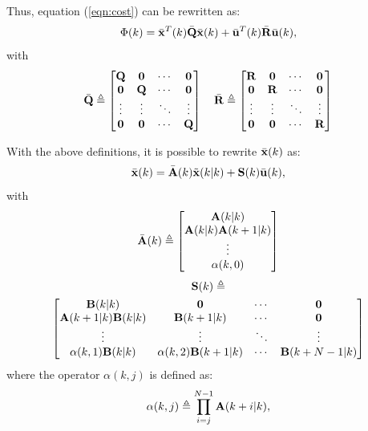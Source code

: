 \documentclass[conference]{IEEEtran} %
\begin{document}
Thus, equation (\ref{eqn:cost}) can be rewritten as:
\begin{equation}\label{eqn:cost2}
	\Phi(k) = \bar{\bf x}^T(k)\bar{\bf Q}\bar{\bf x}(k) + \bar{\bf u}^T(k)\bar{\bf R}\bar{\bf u}(k),
\end{equation}
with
\begin{equation*}
	\bar {\bf Q} \triangleq \begin{bmatrix}
		{\bf Q} & {\bf 0} & \cdots & {\bf 0} \\
		{\bf 0} & {\bf Q} & \cdots & {\bf 0} \\
		\vdots  & \vdots  & \ddots & \vdots  \\
		{\bf 0} & {\bf 0} & \cdots & {\bf Q}
	\end{bmatrix} \quad
	\bar {\bf R} \triangleq \begin{bmatrix}
		{\bf R} & {\bf 0} & \cdots & {\bf 0} \\
		{\bf 0} & {\bf R} & \cdots & {\bf 0} \\
		\vdots  & \vdots  & \ddots & \vdots  \\
		{\bf 0} & {\bf 0} & \cdots & {\bf R}
	\end{bmatrix}
\end{equation*}

With the above definitions, it is possible to rewrite $\bar{\bf x}(k)$ as:
\begin{equation}\label{eqn:exbar}
	\bar{\bf x}(k) = \bar{\bf A}(k)\tilde{\bf x}(k|k)+{\bf S}(k)\bar{\bf u}(k),
\end{equation}
with
\begin{equation*}
	\bar{\bf A}(k) \triangleq \begin{bmatrix}
		{\bf A}(k|k) \\ {\bf A}(k|k){\bf A}(k+1|k) \\ \vdots \\ \alpha(k,0)
	\end{bmatrix}
\end{equation*}
{\small
\begin{multline*}
		{\bf S}(k) \triangleq \\ \begin{bmatrix}
			{\bf B}(k|k)		       & {\bf 0} 			    	 & \cdots & {\bf 0}         \\
			{\bf A}(k+1|k){\bf B}(k|k) & {\bf B}(k+1|k)      	 & \cdots & {\bf 0}         \\
			\vdots			       & \vdots				 & \ddots & \vdots          \\
			\alpha(k,1){\bf B}(k|k)    & \alpha(k,2){\bf B}(k+1|k) & \cdots & {\bf B}(k+N-1|k)
		\end{bmatrix}
\end{multline*}
}
where the operator $\alpha(k,j)$ is defined as:
\begin{equation*}
	\alpha(k,j) \triangleq \prod_{i=j}^{N-1}{\bf A}(k+i|k),
\end{equation*}
\end{document}
